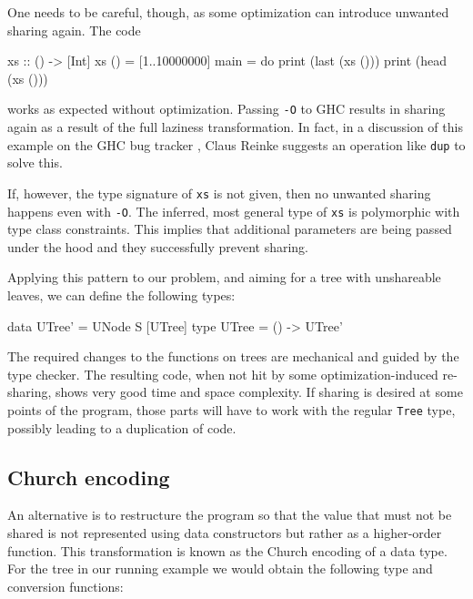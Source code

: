 \documentclass[preprint]{sigplanconf}
\theoremstyle{nonumberplain}
\newcommand{\li}{\lstinline[style=Haskell]}
\newcommand{\ci}{\lstinline[style=Cmm]}
\begin{document}
One needs to be careful, though, as some optimization can introduce unwanted sharing again. The code
\begin{haskell}
xs :: () -> [Int]
xs () = [1..10000000]
main = do
    print (last (xs ()))
    print (head (xs ()))
\end{haskell}
works as expected without optimization. Passing  \ci!-O! to GHC results in sharing again as a result of the full laziness transformation. In fact, in a discussion of this example on the GHC bug tracker \citep{spaceleakbug}, Claus Reinke suggests an operation like \li-dup- to solve this.

If, however, the type signature of \li-xs- is not given, then no unwanted sharing happens even with \ci!-O!. The inferred, most general type of \li-xs- is polymorphic with type class constraints. This implies that additional parameters are being passed under the hood and they successfully prevent sharing.

Applying this pattern to our problem, and aiming for a tree with unshareable leaves, we can define the following types:
\begin{haskell}
data UTree' = UNode S [UTree]
type UTree = () -> UTree'
\end{haskell}
The required changes to the functions on trees are mechanical and guided by the type checker. The resulting code, when not hit by some optimization-induced re-sharing, shows very good time and space complexity. If sharing is desired at some points of the program, those parts will have to work with the regular \li-Tree- type, possibly leading to a duplication of code.

\subsection{Church encoding}
\label{sec:church}

An alternative is to restructure the program so that the value that must not be shared is not represented using data constructors but rather as a higher-order function. This transformation is known as the Church encoding of a data type. For the tree in our running example we would obtain the following type and conversion functions:
\end{document}
